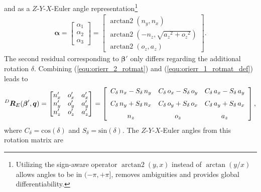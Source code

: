 \documentclass[robotics,article,submit,moreauthors,pdftex]{Definitions/mdpi}
\newcommand{\bm}[1]{\boldsymbol{#1}}
\DeclareMathOperator{\arctantwo}{arctan2}
\newcommand{\rotmat}[2]{{{ }^{#1}\boldsymbol{R}}_{#2}}
\begin{document}
%
and as a $Z$-$Y$-$X$-Euler angle representation\footnote{Utilizing the sign-aware operator $\arctantwo(y,x)$ instead of $\arctan(y/x)$ allows angles to be in $(-\pi,+\pi]$, removes ambiguities and provides global differentiability.}
%
\begin{align}
    \bm{\alpha}
	=
	\begin{bmatrix}
	\alpha_1 \\
	\alpha_2 \\
	\alpha_3
    \end{bmatrix}
	=
    \begin{bmatrix}
        \arctantwo \left( {n_y} , { n_x} \right) \\ 
        \arctantwo \left( -{n_z} , \sqrt {{{a_z}}^{2}+{{ o_z}}^{2}} \right) \\ 
        \arctantwo \left( {o_z} , {a_z} \right)
    \end{bmatrix}.
    \label{equ:alpha_zyx}
\end{align}
%
The second residual corresponding to $\bm{\beta}'$ only differs regarding the additional rotation $\delta$. Combining (\ref{equ:orierr_2_rotmat}) and (\ref{equ:orierr_1_rotmat_def}) leads to
%
\begin{align}
    \rotmat{D}{E}(\bm{\beta}',\bm{q})
    =
    \begin{bmatrix}
    {n'_x}&{o'_x}&{a'_x} \\
    {n'_y}&{o'_y}&{a'_y} \\ 
    {n'_z}&{o'_z}&{a'_z} \\ 
    \end{bmatrix}
    = 
    \left[ \begin {array}{ccc} { C_{\delta}}\,{n_x}-{ S_{\delta}}\,{ n_y}&{ C_{\delta}}\,{o_x}-{ S_{\delta}}\,{o_y}&{ C_{\delta}}\,{ a_x}-{ S_{\delta}}\,{a_y}\\ \noalign{\medskip}{ C_{\delta}}\,{n_y}+ { S_{\delta}}\,{n_x}&{ C_{\delta}}\,{o_y}+{ S_{\delta}}\,{o_x}&{  C_{\delta}}\,{a_y}+{ S_{\delta}}\,{a_x}\\ \noalign{\medskip}{ n_z}&{o_z}&{a_z}\end {array} \right], \nonumber
\end{align}
%
where $C_{\delta}=\mathrm{cos}(\delta)$ and $S_{\delta}=\mathrm{sin}(\delta)$.
The $Z$-$Y$-$X$-Euler angles from this rotation matrix are
%
\end{document}
